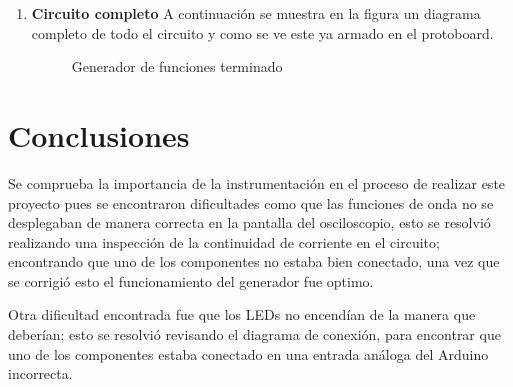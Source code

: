\documentclass[11pt]{article}
\begin{document}
\begin{enumerate}[label=\textbf{Paso \arabic*:}]
\item \textbf{Circuito completo}
A continuación se muestra en la figura un diagrama completo de todo el circuito y como se ve este ya armado en el protoboard.

\begin{figure}[H]
\centering
{}
\caption{Generador de funciones terminado}
\label{fig:arduino}
\end{figure}
\end{enumerate}





\section{Conclusiones}
Se comprueba la importancia de la instrumentación en el proceso de realizar este proyecto pues se encontraron dificultades como que las funciones de onda no se desplegaban de manera correcta en la pantalla del osciloscopio, esto se resolvió realizando una inspección de la continuidad de corriente en el circuito; encontrando que uno de los componentes no estaba bien conectado, una vez que se corrigió esto el funcionamiento del generador fue optimo.

Otra dificultad encontrada fue que los LEDs no encendían de la manera que deberían; esto se resolvió revisando el diagrama de conexión, para encontrar que uno de los componentes estaba conectado en una entrada análoga del Arduino incorrecta.
\end{document}
